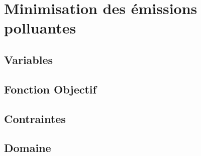 \section{Minimisation des émissions polluantes}


\subsection{Variables}
\subsection{Fonction Objectif}
\subsection{Contraintes}
\subsection{Domaine}
